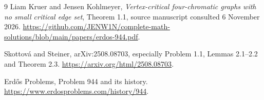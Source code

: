\documentclass[11pt]{article}
\begin{document}
\begin{thebibliography}{9}
Liam Kruer and Jensen Kohlmeyer,
\emph{Vertex-critical four-chromatic graphs with no small critical edge set},
Theorem 1.1, source manuscript consulted 6 November 2026.
\url{https://github.com/JENW1N/complete-math-solutions/blob/main/papers/erdos-944.pdf}.

Skottov\'a and Steiner, arXiv:2508.08703,
especially Problem 1.1, Lemmas 2.1--2.2 and Theorem 2.3.
\url{https://arxiv.org/html/2508.08703}.

Erd\H{o}s Problems, Problem 944 and its history.
\url{https://www.erdosproblems.com/history/944}.
\end{thebibliography}
\end{document}

